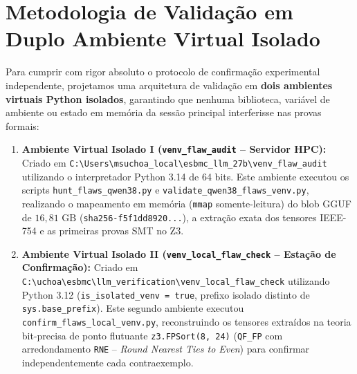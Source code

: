 \documentclass[11pt,a4paper]{article}
\theoremstyle{definition}
\begin{document}
\section{Metodologia de Validação em Duplo Ambiente Virtual Isolado}

Para cumprir com rigor absoluto o protocolo de confirmação experimental independente, projetamos uma arquitetura de validação em \textbf{dois ambientes virtuais Python isolados}, garantindo que nenhuma biblioteca, variável de ambiente ou estado em memória da sessão principal interferisse nas provas formais:

\begin{enumerate}
    \item \textbf{Ambiente Virtual Isolado I (\texttt{venv\_flaw\_audit} -- Servidor HPC):} Criado em \texttt{C:\textbackslash Users\textbackslash msuchoa\_local\textbackslash esbmc\_llm\_27b\textbackslash venv\_flaw\_audit} utilizando o interpretador Python 3.14 de 64 bits. Este ambiente executou os scripts \texttt{hunt\_flaws\_qwen38.py} e \texttt{validate\_qwen38\_flaws\_venv.py}, realizando o mapeamento em memória (\texttt{mmap} somente-leitura) do blob GGUF de $16{,}81\text{ GB}$ (\texttt{sha256-f5f1dd8920...}), a extração exata dos tensores IEEE-754 e as primeiras provas SMT no Z3.
    \item \textbf{Ambiente Virtual Isolado II (\texttt{venv\_local\_flaw\_check} -- Estação de Confirmação):} Criado em \texttt{C:\textbackslash uchoa\textbackslash esbmc\textbackslash llm\_verification\textbackslash venv\_local\_flaw\_check} utilizando Python 3.12 (\texttt{is\_isolated\_venv = true}, prefixo isolado distinto de \texttt{sys.base\_prefix}). Este segundo ambiente executou \texttt{confirm\_flaws\_local\_venv.py}, reconstruindo os tensores extraídos na teoria bit-precisa de ponto flutuante \texttt{z3.FPSort(8, 24)} (\texttt{QF\_FP} com arredondamento \texttt{RNE} -- \textit{Round Nearest Ties to Even}) para confirmar independentemente cada contraexemplo.
\end{enumerate}
\end{document}
